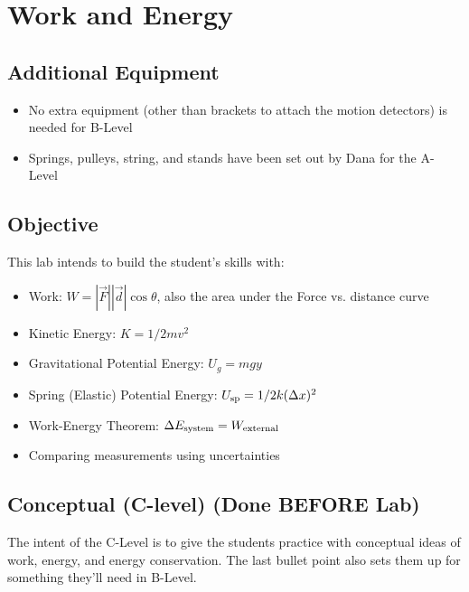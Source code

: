 \documentclass[fleqn,letterpaper]{article}
\begin{document}
\cfoot{}
\headsep=25pt

\section*{Work and Energy}

\subsection*{Additional Equipment}

\begin{itemize}
  \item{No extra equipment (other than brackets to attach the motion detectors) is needed for B-Level}
  \item{Springs, pulleys, string, and stands have been set out by Dana for the A-Level}
\end{itemize}

\subsection*{Objective}

This lab intends to build the student's skills with:
%
\begin{itemize}
 \item{Work:  $W = |\vec{F}|  |\vec{d}|  \cos \theta$, also the area under the Force vs. distance curve}
 \item{Kinetic Energy:  $K = 1/2 m v^2$}
 \item{Gravitational Potential Energy:  $U_g = mgy$ }
 \item{Spring (Elastic) Potential Energy:  $U_{\rm sp} = 1/2 k (\Delta x)^2$}
 \item{Work-Energy Theorem:  $\Delta E_{\rm system} = W_{\rm external}$}
 \item{Comparing measurements using uncertainties}
\end{itemize}
%

\subsection*{Conceptual (C-level) (Done BEFORE Lab)}

The intent of the C-Level is to give the students practice with conceptual ideas of work, energy, and energy conservation.  The last bullet point also sets them up for something they'll need in B-Level.
\end{document}
